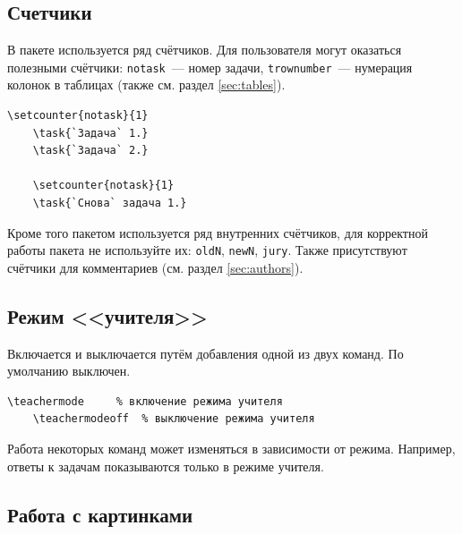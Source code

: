 \subsection{Счетчики}

В пакете используется ряд счётчиков. Для пользователя могут оказаться полезными счётчики:
\texttt{notask}~--- номер задачи, \texttt{trownumber}~--- нумерация колонок в таблицах (также см. раздел
\ref{sec:tables}).

\begin{lstlisting}[gobble=3]
    \setcounter{notask}{1}
    \task{`Задача` 1.}
    \task{`Задача` 2.}
    
    \setcounter{notask}{1}
    \task{`Снова` задача 1.}
\end{lstlisting}

\setcounter{notask}{1}
\noindent
{}
\noindent
{}

\setcounter{notask}{1}
\noindent
{}

\setcounter{notask}{1}

\vspace{0.5cm}

Кроме того пакетом используется ряд внутренних счётчиков, для корректной работы пакета не используйте их:
\texttt{oldN}, \texttt{newN}, \texttt{jury}. Также присутствуют счётчики для комментариев (см. раздел
\ref{sec:authors}).


\subsection{Режим <<учителя>>}
\label{sec:teacher}

Включается и выключается путём добавления одной из двух команд. По умолчанию
выключен.

\begin{lstlisting}[gobble = 3]
    \teachermode     % включение режима учителя
    \teachermodeoff  % выключение режима учителя
\end{lstlisting}

Работа некоторых команд может изменяться в зависимости от режима. Например, ответы к задачам показываются
только в режиме учителя.


\subsection{Работа с картинками}

